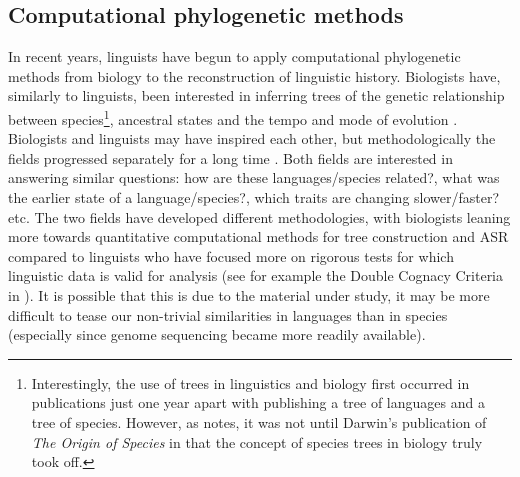 \documentclass[12pt,letterpaper]{article}
\begin{document}

\subsection{Computational phylogenetic methods}
\label{sec:asr_methods}
In recent years, linguists have begun to apply computational phylogenetic methods from biology to the reconstruction of linguistic history. Biologists have, similarly to linguists, been interested in inferring trees of the genetic relationship between species\footnote{Interestingly, the use of trees in linguistics and biology first occurred in publications just one year apart with \citet{schlegel1808sprache} publishing a tree of languages and \citet{lamarck1809philosophie} a tree of species. However, as \citet[370]{greenhill2015evolution} notes, it was not until Darwin's publication of \emph{The Origin of Species} in  \citeyear{darwin1859origin} that the concept of species trees in biology truly took off.}, ancestral states and the tempo and mode of evolution \citep{atkinson2005curious}. Biologists and linguists may have inspired each other, but methodologically the fields progressed separately for a long time \citep[370]{greenhill2015evolution}. Both fields are interested in answering similar questions: how are these languages/species related?, what was the earlier state of a language/species?, which traits are changing slower/faster? etc. The two fields have developed different methodologies, with biologists leaning more towards quantitative computational methods for tree construction and ASR compared to linguists who have focused more on rigorous tests for which linguistic data is valid for analysis (see for example the Double Cognacy Criteria in \citet{walkden_2013}). It is possible that this is due to the material under study, it may be more difficult to tease our non-trivial similarities in languages than in species (especially since genome sequencing became more readily available).
\end{document}
